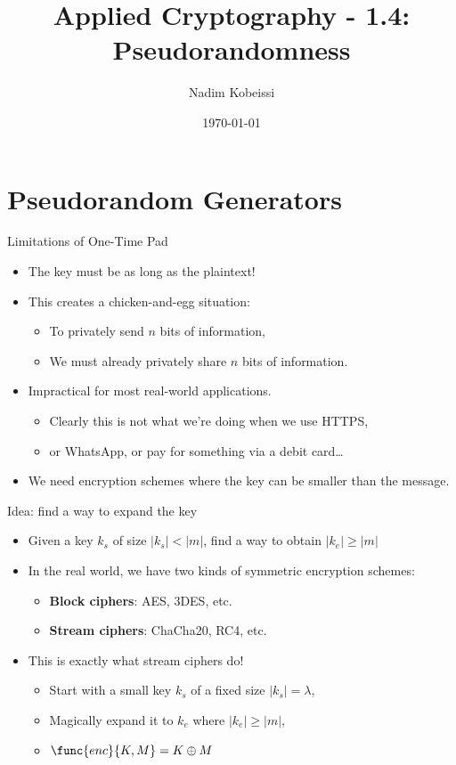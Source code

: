 \documentclass[aspectratio=169, lualatex, handout]{beamer}
\title{Applied Cryptography - 1.4: Pseudorandomness}
\author{Nadim Kobeissi}
\institute{American University of Beirut}
\date{\today}
\begin{document}
\begin{frame}[plain]
	\titlepage
\end{frame}

\section{Pseudorandom Generators}

\begin{frame}{Limitations of One-Time Pad}
	\begin{itemize}
		\item The key must be as long as the plaintext!
		\item This creates a chicken-and-egg situation:
		      \begin{itemize}
			      \item To privately send $n$ bits of information,
			      \item We must already privately share $n$ bits of information.
		      \end{itemize}
		\item Impractical for most real-world applications.
		      \begin{itemize}
			      \item Clearly this is not what we're doing when we use HTTPS,
			      \item or WhatsApp, or pay for something via a debit card\ldots
		      \end{itemize}
		\item We need encryption schemes where the key can be smaller than the message.
	\end{itemize}
\end{frame}

\begin{frame}{Idea: find a way to expand the key}
	\begin{itemize}
		\item Given a key $k_s$ of size $\left|k_s\right| < \left|m\right|$, find a way to obtain $\left|k_e\right| \geq \left|m\right|$
		\item In the real world, we have two kinds of symmetric encryption schemes:
		      \begin{itemize}
			      \item \textbf{Block ciphers}: AES, 3DES, etc.
			      \item \textbf{Stream ciphers}: ChaCha20, RC4, etc.
		      \end{itemize}
		\item This is exactly what stream ciphers do!
		      \begin{itemize}
			      \item Start with a small key $k_s$ of a fixed size $\left|k_s\right| = \lambda$,
			      \item Magically expand it to $k_e$ where $\left|k_e\right| \geq \left|m\right|$,
			      \item $\func{enc}{K, M} = K \oplus M$
		      \end{itemize}
	\end{itemize}
\end{frame}
\end{document}
